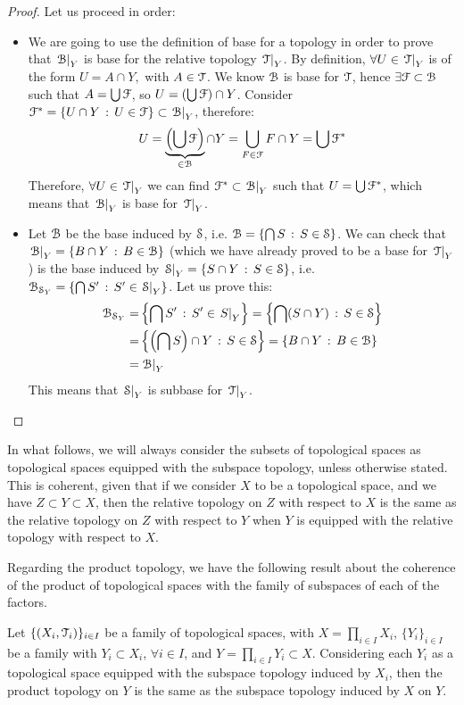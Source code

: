 \begin{proof}
	Let us proceed in order:
	\begin{itemize}
	\item We are going to use the definition of base for a topology in order to prove that $\Rel{\B}{Y}$  is base for the relative topology $\Trel{Y}$. By definition, $\forall U\in\Trel{Y}$ is of the form $U = A\cap Y,$ with $A\in\T$. We know $\B$ is base for $\T$, hence $\exists \F\subset \B$ such that $A=\bigcup \F$, so $U=(\bigcup \F)\cap Y$. Consider $\F^*=\setdef{U\cap Y}{U\in\F}\subset\Rel{\B}{Y}$, therefore:
	$$
	  U=\underbrace{\left(\bigcup \F\right)}_{\in\B}\cap Y=\bigcup_{F\in \F}F\cap Y=\bigcup \F^*
	$$
	Therefore, $\forall U\in\Trel{Y}$ we can find $\F^*\subset \Rel{\B}{Y}$ such that $U=\bigcup \F^*$, which means that $\Rel{\B}{Y}$ is base for $\Trel{Y}$.
	\item Let $\B$ be the base induced by $\S$, i.e. $\B=\setdef{\bigcap S}{S\in\S}$. We can check that $\Rel{\B}{Y} = \setdef{B\cap Y}{B\in\B}$ (which we have already proved to be a base for $\Trel{Y}$) is the base induced by $\Rel{\S}{Y} =\setdef{S\cap Y}{S\in\S}$, i.e. $\B_{\S_Y}=\setdef{\bigcap S'}{S'\in\Rel{\S}{Y}}$. Let us prove this:
		\begin{align*}
		\B_{\S_Y}=&\setdef{\bigcap S'}{S'\in\Rel{S}{Y}}=\setdef{\bigcap (S\cap Y)}{S\in\S}\\
		=&\setdef{\left(\bigcap S\right)\cap Y}{S\in\S}=\setdef{B\cap Y}{B\in\B}\\
		=&\Rel{\B}{Y}
		\end{align*}
	This means that $\Rel{\S}{Y}$ is subbase for $\Trel{Y}$.
	\end{itemize}
\end{proof}

In what follows, we will always consider the subsets of topological spaces as topological spaces equipped with the subspace topology, unless otherwise stated.
This is coherent, given that if we consider $X$ to be a topological space, and we have $Z\subset Y\subset X$, then the relative topology on $Z$ with respect to $X$ is the same as the relative topology on $Z$ with respect to $Y$ when $Y$ is equipped with the relative topology with respect to $X$.

Regarding the product topology, we have the following result about the coherence of the product of topological spaces with the family of subspaces of each of the factors.

\begin{theorem}
	\label{th:product-subspace-topology}
	Let $\{(X_i, \T_i)\}_{i\in I}$ be a family of topological spaces, with $X=\prod_{i\in I} X_i$,
	$\{Y_i\}_{i\in I}$ be a family with $Y_i\subset X_i$, $\forall i\in I$, and $Y=\prod_{i\in I}Y_i\subset X$.
	Considering each $Y_i$ as a topological space equipped with the subspace topology
	induced by $X_i$, then the product topology on $Y$ is the same as the subspace topology induced by $X$ on $Y$.
\end{theorem}

